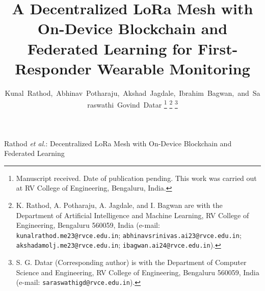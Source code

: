 \documentclass[journal]{IEEEtran}
\begin{document}
\title{A Decentralized LoRa Mesh with On-Device Blockchain and Federated
Learning for First-Responder Wearable Monitoring}

\author{Kunal~Rathod,~Abhinav~Potharaju,~Akshad~Jagdale,~Ibrahim~Bagwan,~and~Saraswathi~Govind~Datar%
\thanks{Manuscript received. Date of publication pending.
This work was carried out at RV College of Engineering, Bengaluru, India.}%
\thanks{K. Rathod, A. Potharaju, A. Jagdale, and I. Bagwan are with the
Department of Artificial Intelligence and Machine Learning, RV College of
Engineering, Bengaluru 560059, India
(e-mail: \texttt{kunalrathod.me23@rvce.edu.in};
\texttt{abhinavsrinivas.ai23@rvce.edu.in};
\texttt{akshadamolj.me23@rvce.edu.in};
\texttt{ibagwan.ai24@rvce.edu.in}).}%
\thanks{S. G. Datar (Corresponding author) is with the Department of
Computer Science and Engineering, RV College of Engineering,
Bengaluru 560059, India
(e-mail: \texttt{saraswathigd@rvce.edu.in}).}}

%
{Rathod \MakeLowercase{\textit{et al.}}: Decentralized LoRa Mesh with
On-Device Blockchain and Federated Learning}

\maketitle
\end{document}
